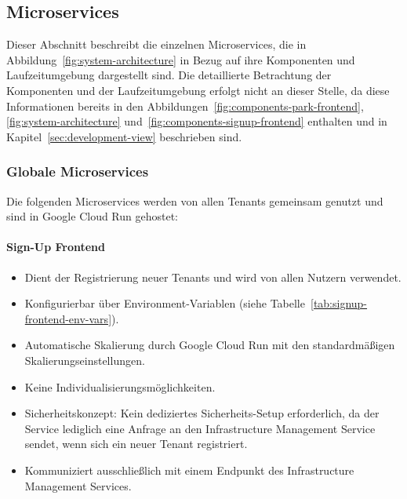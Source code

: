 \subsection{Microservices}
Dieser Abschnitt beschreibt die einzelnen Microservices, die in Abbildung~\ref{fig:system-architecture} in Bezug auf ihre Komponenten und Laufzeitumgebung dargestellt sind. Die detaillierte Betrachtung der Komponenten und der Laufzeitumgebung erfolgt nicht an dieser Stelle, da diese Informationen bereits in den Abbildungen~\ref{fig:components-park-frontend}, \ref{fig:system-architecture} und~\ref{fig:components-signup-frontend} enthalten und in Kapitel~\ref{sec:development-view} beschrieben sind.

\subsubsection{Globale Microservices}
Die folgenden Microservices werden von allen Tenants gemeinsam genutzt und sind in Google Cloud Run gehostet:

\paragraph{Sign-Up Frontend}
\label{sec:signup-frontend}
\begin{itemize}
	\item Dient der Registrierung neuer Tenants und wird von allen Nutzern verwendet.
	\item Konfigurierbar über Environment-Variablen (siehe Tabelle~\ref{tab:signup-frontend-env-vars}).
	\item Automatische Skalierung durch Google Cloud Run mit den standardmäßigen Skalierungseinstellungen.
	\item Keine Individualisierungsmöglichkeiten.
	\item Sicherheitskonzept: Kein dediziertes Sicherheits-Setup erforderlich, da der Service lediglich eine Anfrage an den Infrastructure Management Service sendet, wenn sich ein neuer Tenant registriert.
	\item Kommuniziert ausschließlich mit einem Endpunkt des Infrastructure Management Services.
\end{itemize}

